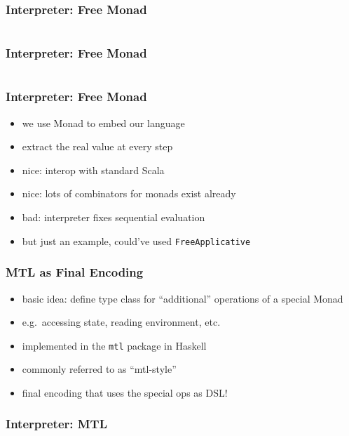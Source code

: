 \documentclass[aspectratio=169, hyperref={colorlinks, linkcolor=beamer@centricgreen}, urlcolor=links]{beamer}
\begin{document}
\begin{frame}
  \frametitle{Interpreter: Free Monad}
  \inputminted[fontsize=\footnotesize]{scala}{snippets/initial-free-sample.scala}
\end{frame}

\begin{frame}
  \frametitle{Interpreter: Free Monad}
  \inputminted[fontsize=\footnotesize]{scala}{snippets/initial-free-interp.scala}
\end{frame}

\begin{frame}
  \frametitle{Interpreter: Free Monad}
  \begin{itemize}
  \item we use Monad to embed our language
  \item extract the real value at every step
  \item nice: interop with standard Scala
  \item nice: lots of combinators for monads exist already
  \item bad: interpreter fixes sequential evaluation
  \item but just an example, could've used \texttt{FreeApplicative}
  \end{itemize}
\end{frame}

\begin{frame}
  \frametitle{MTL as Final Encoding}
  \begin{itemize}
  \item basic idea: define type class for ``additional'' operations of a special Monad
  \item e.g.\ accessing state, reading environment, etc.
  \item implemented in the \texttt{mtl} package in Haskell
  \item commonly referred to as ``mtl-style''
  \item final encoding that uses the special ops as DSL!\@
  \end{itemize}
\end{frame}

\begin{frame}
  \frametitle{Interpreter: MTL}
\end{frame}
\end{document}
